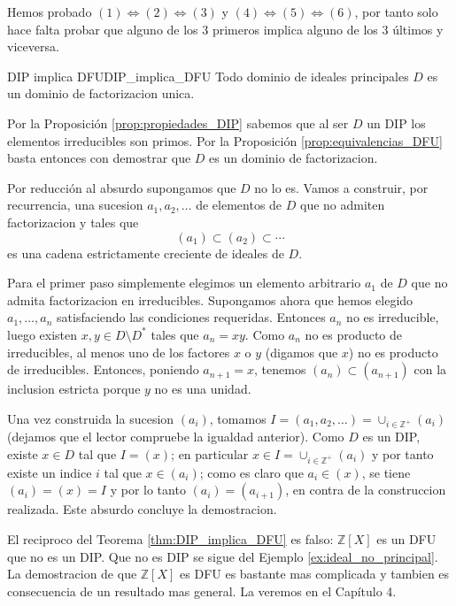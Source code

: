 \begin{remark}
    Hemos probado $(1) \Leftrightarrow (2) \Leftrightarrow (3)$ y $(4) \Leftrightarrow (5) \Leftrightarrow (6)$, por tanto solo hace falta probar que alguno de los 3 primeros implica alguno de los 3 últimos y viceversa.
\end{remark}

\begin{theorem}{DIP implica DFU}{DIP_implica_DFU}
Todo dominio de ideales principales \(D\) es un dominio de factorizacion unica.
\end{theorem}

\begin{proofbox}
Por la Proposición \ref{prop:propiedades_DIP} sabemos que al ser $D$ un DIP los elementos irreducibles son primos. Por la Proposición \ref{prop:equivalencias_DFU} basta entonces con demostrar que \(D\) es un dominio de factorizacion.

Por reducción al absurdo supongamos que \(D\) no lo es. Vamos a construir, por recurrencia, una sucesion \(a_1, a_2, \ldots\) de elementos de \(D\) que no admiten factorizacion y tales que
\[
(a_1) \subset (a_2) \subset \cdots
\]
es una cadena estrictamente creciente de ideales de \(D\).

Para el primer paso simplemente elegimos un elemento arbitrario \(a_1\) de \(D\) que no admita factorizacion en irreducibles. Supongamos ahora que hemos elegido \(a_1, \ldots, a_n\) satisfaciendo las condiciones requeridas. Entonces \(a_n\) no es irreducible, luego existen \(x, y \in D \setminus D^*\) tales que \(a_n = xy\). Como \(a_n\) no es producto de irreducibles, al menos uno de los factores \(x\) o \(y\) (digamos que \(x\)) no es producto de irreducibles. Entonces, poniendo \(a_{n+1} = x\), tenemos \((a_n) \subset (a_{n+1})\) con la inclusion estricta porque \(y\) no es una unidad.

Una vez construida la sucesion \((a_i)\), tomamos \(I = (a_1, a_2, \ldots) = \cup_{i \in \mathbb{Z}^+}(a_i)\) (dejamos que el lector compruebe la igualdad anterior). Como \(D\) es un DIP, existe \(x \in D\) tal que \(I = (x)\); en particular \(x \in I = \cup_{i \in \mathbb{Z}^+}(a_i)\) y por tanto existe un indice \(i\) tal que \(x \in (a_i)\); como es claro que \(a_i \in (x)\), se tiene \((a_i) = (x) = I\) y por lo tanto \((a_i) = (a_{i+1})\), en contra de la construccion realizada. Este absurdo concluye la demostracion.
\end{proofbox}

El reciproco del Teorema \ref{thm:DIP_implica_DFU} es falso: \(\mathbb{Z}[X]\) es un DFU que no es un DIP. Que no es DIP se sigue del Ejemplo \ref{ex:ideal_no_principal}. La demostracion de que \(\mathbb{Z}[X]\) es DFU es bastante mas complicada y tambien es consecuencia de un resultado mas general. La veremos en el Capítulo 4.

